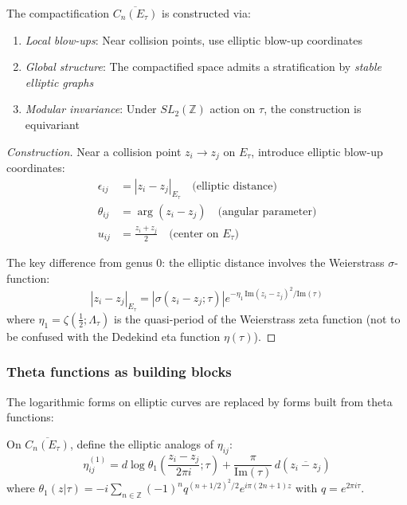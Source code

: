 \begin{theorem}
\label{thm:elliptic-compactification}
The compactification $\overline{C_n(E_\tau)}$ is constructed via:
\begin{enumerate}
\item \emph{Local blow-ups}: Near collision points, use elliptic blow-up coordinates
\item \emph{Global structure}: The compactified space admits a stratification by \emph{stable elliptic graphs}
\item \emph{Modular invariance}: Under $SL_2(\mathbb{Z})$ action on $\tau$, the construction is equivariant
\end{enumerate}
\end{theorem}

\begin{proof}[Construction]
Near a collision point $z_i \to z_j$ on $E_\tau$, introduce elliptic blow-up coordinates:
\begin{align}
\epsilon_{ij} &= |z_i - z_j|_{E_\tau} \quad \text{(elliptic distance)} \\
\theta_{ij} &= \arg(z_i - z_j) \quad \text{(angular parameter)} \\
u_{ij} &= \frac{z_i + z_j}{2} \quad \text{(center on } E_\tau)
\end{align}

The key difference from genus 0: the elliptic distance involves the Weierstrass $\sigma$-function:
\[
|z_i - z_j|_{E_\tau} = |\sigma(z_i - z_j; \tau)|e^{-\eta_1\,\text{Im}(z_i - z_j)^2/\text{Im}(\tau)}
\]
where $\eta_1 = \zeta(\tfrac{1}{2}; \Lambda_\tau)$ is the quasi-period of the Weierstrass zeta function (not to be confused with the Dedekind eta function $\eta(\tau)$).
\end{proof}

\subsubsection{Theta functions as building blocks}

The logarithmic forms on elliptic curves are replaced by forms built from theta functions:

\begin{definition}
On $\overline{C_n(E_\tau)}$, define the elliptic analogs of $\eta_{ij}$:
\[
\eta_{ij}^{(1)} = d\log\theta_1\left(\frac{z_i - z_j}{2\pi i}; \tau\right) + \frac{\pi}{\mathrm{Im}(\tau)}\, d(\overline{z_i - z_j})
\]
where $\theta_1(z|\tau) = -i\sum_{n \in \mathbb{Z}}(-1)^n q^{(n+1/2)^2/2}e^{i\pi(2n+1)z}$ with $q = e^{2\pi i\tau}$.
\end{definition}

